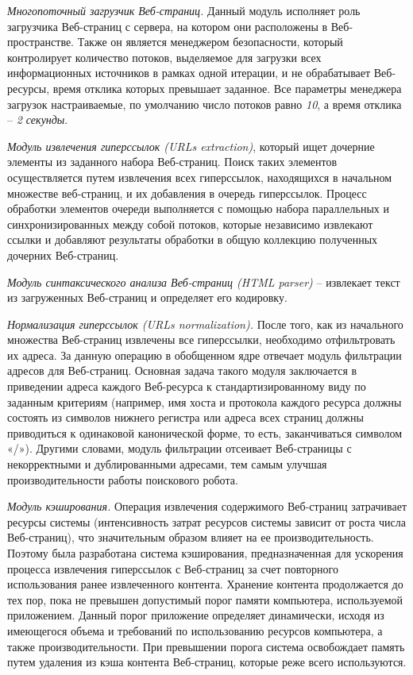 \textit{Многопоточный загрузчик Веб-страниц.} Данный модуль исполняет роль загрузчика Веб-страниц с сервера, на котором они расположены в Веб-пространстве. Также он является менеджером безопасности, который контролирует количество потоков, выделяемое для загрузки всех информационных источников в рамках одной итерации, и не обрабатывает Веб-ресурсы, время отклика которых превышает заданное. Все параметры менеджера загрузок настраиваемые, по умолчанию число потоков равно \textit{10}, а время отклика -- \textit{2 секунды}.

\textit{Модуль извлечения гиперссылок (URLs extraction)}, который ищет дочерние элементы из заданного набора Веб-страниц. Поиск таких элементов осуществляется путем извлечения всех гиперссылок, находящихся в начальном множестве веб-страниц, и их добавления в очередь гиперссылок. Процесс обработки элементов очереди выполняется с помощью набора параллельных и синхронизированных между собой потоков, которые независимо извлекают ссылки и добавляют результаты обработки в общую коллекцию полученных дочерних Веб-страниц.

\textit{Модуль синтаксического анализа Веб-страниц (HTML parser)} -- извлекает текст из загруженных Веб-страниц и определяет его кодировку.

\textit{Нормализация гиперссылок (URLs normalization).} После того, как из начального множества Веб-страниц извлечены все гиперссылки, необходимо отфильтровать их адреса. За данную операцию в обобщенном ядре отвечает модуль фильтрации адресов для Веб-страниц. Основная задача такого модуля заключается в приведении адреса каждого Веб-ресурса к стандартизированному виду по заданным критериям \cite{LeeKimHong} (например, имя хоста и протокола каждого ресурса должны состоять из символов нижнего регистра или адреса всех страниц должны приводиться к одинаковой канонической форме, то есть, заканчиваться символом «/»). Другими словами, модуль фильтрации отсеивает Веб-страницы с некорректными и дублированными адресами, тем самым улучшая производительности работы поискового робота.

\textit{Модуль кэширования.} Операция извлечения содержимого Веб-страниц затрачивает ресурсы системы (интенсивность затрат ресурсов системы зависит от роста числа Веб-страниц), что значительным образом влияет на ее производительность. Поэтому была разработана система кэширования, предназначенная для ускорения процесса извлечения гиперссылок с Веб-страниц за счет повторного использования ранее извлеченного контента. Хранение контента продолжается до тех пор, пока не превышен допустимый порог памяти компьютера, используемой приложением. Данный порог приложение определяет динамически, исходя из имеющегося объема и требований по использованию ресурсов компьютера, а также производительности. При превышении порога система освобождает память путем удаления из кэша контента Веб-страниц, которые реже всего используются.


